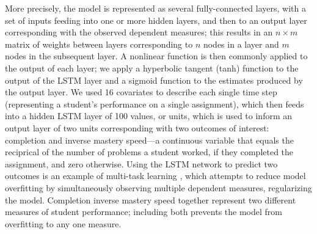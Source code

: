 More precisely,
the model is represented as several fully-connected layers, with a set
of inputs feeding into one or more hidden layers, and then to an
output layer corresponding with the observed dependent measures; this
results in an $n\times m$ matrix of weights between layers
corresponding to $n$ nodes in a layer and $m$ nodes in the subsequent
layer.
A nonlinear function is then commonly applied to the output of each
layer; we apply a hyperbolic tangent (tanh) function to the output of
the LSTM layer and a sigmoid function to the estimates produced by the
output layer.
We used 16 covariates to describe each single time step (representing
a student’s performance on a single assignment), which then feeds into
a hidden LSTM layer of 100 values, or units, which is used to inform
an output layer of two units corresponding with two outcomes of
interest: completion and inverse mastery speed---a continuous variable
that equals the reciprical of the number of problems a student worked,
if they completed the assignment, and zero otherwise.
Using the LSTM network to predict two outcomes is an example of
multi-task learning \cite{}, which attempts to
reduce model overfitting by simultaneously observing multiple
dependent measures, regularizing the model. Completion inverse mastery
speed together represent two different measures of student
performance; including both prevents the model from overfitting to any
one measure.


